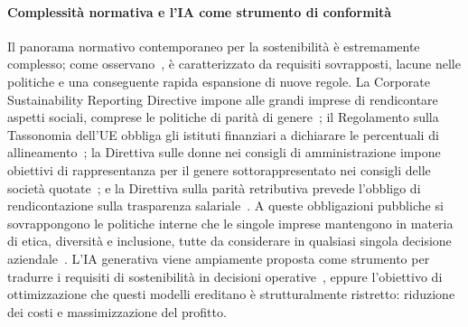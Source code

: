 \documentclass[pdflatex, sn-apa]{sn-jnl}%
\theoremstyle{thmstyleone}%
\theoremstyle{thmstyletwo}%
\theoremstyle{thmstylethree}%
\begin{document}
\paragraph{Complessità normativa e l'IA come strumento di conformità}
Il panorama normativo contemporaneo per la sostenibilità è estremamente
complesso; come osservano~\citet{sargsyan2025legends}, è caratterizzato da
requisiti sovrapposti, lacune nelle politiche e una conseguente rapida
espansione di nuove regole. La Corporate Sustainability Reporting Directive
impone alle grandi imprese di rendicontare aspetti sociali, comprese le
politiche di parità di genere~\citep{europeancommission2022csrd}; il Regolamento
sulla Tassonomia dell'UE obbliga gli istituti finanziari a dichiarare le
percentuali di allineamento~\citep{europeancommission2025taxonomy}; la Direttiva
sulle donne nei consigli di amministrazione impone obiettivi di rappresentanza
per il genere sottorappresentato nei consigli delle società
quotate~\citep{europeanparliament2022wob}; e la Direttiva sulla parità
retributiva prevede l'obbligo di rendicontazione sulla trasparenza
salariale~\citep{europeancommission2025equalpay}. A queste obbligazioni
pubbliche si sovrappongono le politiche interne che le singole imprese
mantengono in materia di etica, diversità e inclusione, tutte da considerare in
qualsiasi singola decisione aziendale~\citep{sargsyan2025legends}. L'IA
generativa viene ampiamente proposta come strumento per tradurre i requisiti di
sostenibilità in decisioni operative~\citep{storey2025genai}, eppure l'obiettivo
di ottimizzazione che questi modelli ereditano è strutturalmente ristretto:
riduzione dei costi e massimizzazione del profitto.
 
\end{document}
